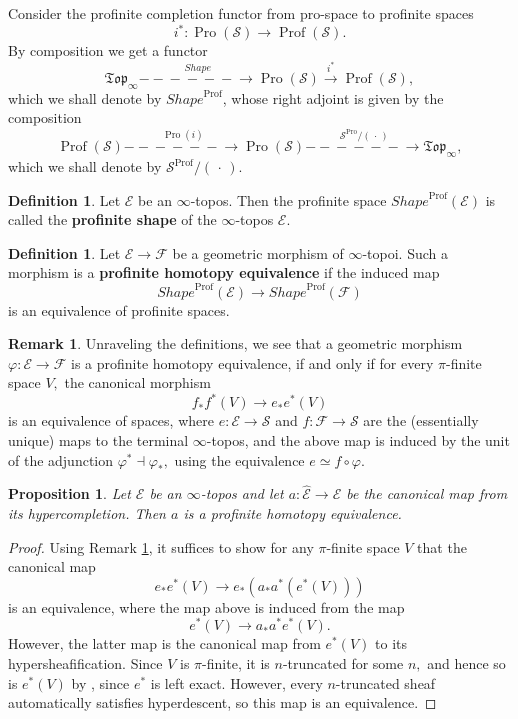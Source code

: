 \documentclass[12pt]{amsart}
\newtheorem{proposition}[dummy]{Proposition}
\theoremstyle{definition}
\newtheorem{definition}[dummy]{Definition}
\newtheorem{remark}[dummy]{Remark}
\newcommand{\cE}{\mathcal{E}}
\newcommand{\cF}{\mathcal{F}}
\newcommand{\cS}{\mathcal{S}}
\renewcommand{\i}{\infty}
\def\Pro{\operatorname{Pro}}
\def\Profs{\operatorname{Prof}\left(\cS\right)}
\def\Prof{\operatorname{Prof}}
\def\Shape{\mathit{Shape}}
\def\longlongrightarrow{-\!\!\!-\!\!\!-\!\!\!-\!\!\!-\!\!\!-\!\!\!\longrightarrow}
\begin{document}
Consider the profinite completion functor from pro-space to profinite spaces $$i^*:\Pro\left(\cS\right) \to \Profs.$$
By composition we get a functor
$$\mathfrak{Top}_\i \stackrel{\Shape}{\longlongrightarrow} \Pro\left(\cS\right) \stackrel{i^*}{\longrightarrow} \Profs,$$ which we shall denote by $\Shape^{\Prof}$, whose right adjoint is given by the composition
$$\Profs \stackrel{\Pro\left(i\right)}{\longlongrightarrow} \Pro\left(\cS\right) \stackrel{\cS^{\Pro}/\left(\mspace{3mu}\cdot\mspace{3mu}\right)}{\longlongrightarrow} \mathfrak{Top}_\i,$$
which we shall denote by $\cS^{\Prof}/\left(\mspace{3mu}\cdot\mspace{3mu}\right).$

\begin{definition}\label{dfn:profiniteshape}
Let $\cE$ be an $\i$-topos. Then the profinite space $\Shape^{\Prof}\left(\cE\right)$ is called the \textbf{profinite shape} of the $\i$-topos $\cE.$
\end{definition}

\begin{definition}\label{dfn:profinite eql}
Let $\cE \to \cF$ be a geometric morphism of $\i$-topoi. Such a morphism is a \textbf{profinite homotopy equivalence} if the induced map $$\Shape^{\Prof}\left(\cE\right) \to \Shape^{\Prof}\left(\cF\right)$$ is an equivalence of profinite spaces.
\end{definition}

\begin{remark}\label{rmk:concprof}
Unraveling the definitions, we see that a geometric morphism $\varphi:\cE \to \cF$ is a profinite homotopy equivalence, if and only if for every $\pi$-finite space $V,$ the canonical morphism
$$f_*f^*\left(V\right)\to e_*e^*\left(V\right)$$ is an equivalence of spaces,
where $e:\cE \to \cS$ and $f:\cF \to \cS$ are the (essentially unique) maps to the terminal $\i$-topos, and the above map is induced by the unit of the adjunction $\varphi^* \dashv \varphi_*,$ using the equivalence $e \simeq f \circ \varphi.$
\end{remark}

\begin{proposition}\label{prop:hypersame}
Let $\cE$ be an $\i$-topos and let $a:\widehat{\cE} \to \cE$ be the canonical map from its hypercompletion. Then $a$ is a profinite homotopy equivalence.
\end{proposition}

\begin{proof}
Using Remark \ref{rmk:concprof}, it suffices to show for any $\pi$-finite space $V$ that the canonical map $$e_*e^*\left(V\right) \to e_*\left(a_*a^*\left(e^*\left(V\right)\right)\right)$$ is an equivalence, where the map above is induced from the map $$e^*\left(V\right) \to a_*a^*e^*\left(V\right).$$ However, the latter map is the canonical map from $e^*\left(V\right)$ to its hypersheafification. Since $V$ is $\pi$-finite, it is $n$-truncated for some $n,$ and hence so is $e^*\left(V\right)$ by \cite[Proposition 5.5.6.16]{htt}, since $e^*$ is left exact. However, every $n$-truncated sheaf automatically satisfies hyperdescent, so this map is an equivalence.
\end{proof}
\end{document}
